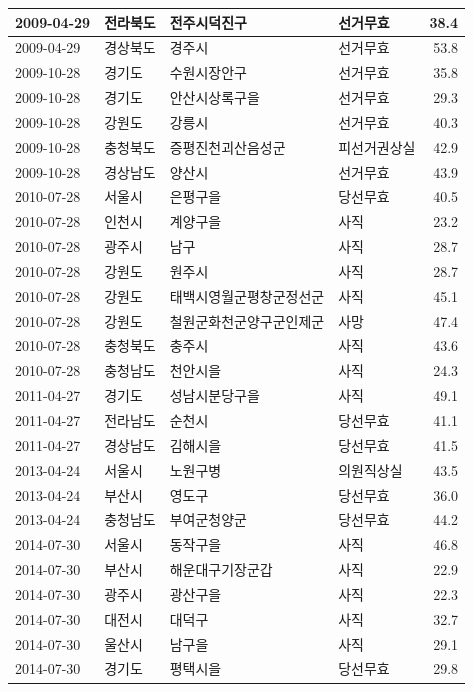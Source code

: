 \documentclass[
  11pt,
  letter]{article}
\begin{document}
\begin{longtable}[t]{l|l|l|l|r}
\hline
2009-04-29 & 전라북도 & 전주시덕진구 & 선거무효 & 38.4\\
\hline
2009-04-29 & 경상북도 & 경주시 & 선거무효 & 53.8\\
\hline
2009-10-28 & 경기도 & 수원시장안구 & 선거무효 & 35.8\\
\hline
2009-10-28 & 경기도 & 안산시상록구을 & 선거무효 & 29.3\\
\hline
2009-10-28 & 강원도 & 강릉시 & 선거무효 & 40.3\\
\hline
2009-10-28 & 충청북도 & 증평진천괴산음성군 & 피선거권상실 & 42.9\\
\hline
2009-10-28 & 경상남도 & 양산시 & 선거무효 & 43.9\\
\hline
2010-07-28 & 서울시 & 은평구을 & 당선무효 & 40.5\\
\hline
2010-07-28 & 인천시 & 계양구을 & 사직 & 23.2\\
\hline
2010-07-28 & 광주시 & 남구 & 사직 & 28.7\\
\hline
2010-07-28 & 강원도 & 원주시 & 사직 & 28.7\\
\hline
2010-07-28 & 강원도 & 태백시영월군평창군정선군 & 사직 & 45.1\\
\hline
2010-07-28 & 강원도 & 철원군화천군양구군인제군 & 사망 & 47.4\\
\hline
2010-07-28 & 충청북도 & 충주시 & 사직 & 43.6\\
\hline
2010-07-28 & 충청남도 & 천안시을 & 사직 & 24.3\\
\hline
2011-04-27 & 경기도 & 성남시분당구을 & 사직 & 49.1\\
\hline
2011-04-27 & 전라남도 & 순천시 & 당선무효 & 41.1\\
\hline
2011-04-27 & 경상남도 & 김해시을 & 당선무효 & 41.5\\
\hline
2013-04-24 & 서울시 & 노원구병 & 의원직상실 & 43.5\\
\hline
2013-04-24 & 부산시 & 영도구 & 당선무효 & 36.0\\
\hline
2013-04-24 & 충청남도 & 부여군청양군 & 당선무효 & 44.2\\
\hline
2014-07-30 & 서울시 & 동작구을 & 사직 & 46.8\\
\hline
2014-07-30 & 부산시 & 해운대구기장군갑 & 사직 & 22.9\\
\hline
2014-07-30 & 광주시 & 광산구을 & 사직 & 22.3\\
\hline
2014-07-30 & 대전시 & 대덕구 & 사직 & 32.7\\
\hline
2014-07-30 & 울산시 & 남구을 & 사직 & 29.1\\
\hline
2014-07-30 & 경기도 & 평택시을 & 당선무효 & 29.8\\

\end{longtable}
\end{document}

